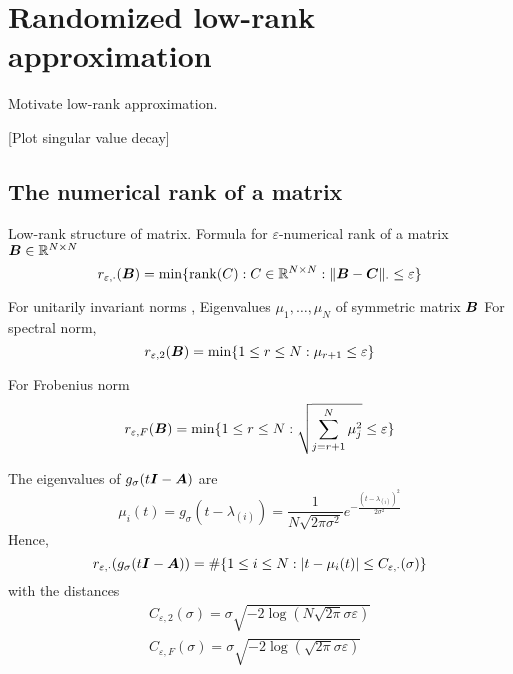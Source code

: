 \chapter{Randomized low-rank approximation}
\label{chp:3-nystrom}

Motivate low-rank approximation.

[Plot singular value decay]


\section{The numerical rank of a matrix}
\label{sec:3-nystrom-numerical-rank}

Low-rank structure of matrix.
Formula for $\varepsilon$-numerical rank \cite[Definition~1.1]{noga2013rank} of a matrix $\boldsymbol{\boldsymbol{B}} \in \mathbb{R}^{N \times N}$
\begin{equation}
    r_{\varepsilon, \cdot}(\boldsymbol{\boldsymbol{B}}) = \min \{\operatorname{rank}(C): C \in \mathbb{R}^{N \times N}: \lVert \boldsymbol{\boldsymbol{B}} - \boldsymbol{C} \rVert _{\cdot} \leq \varepsilon \}
    \label{equ:3-nystrom-SS-def-numerical-low-rank}
\end{equation}

For unitarily invariant norms \cite[Theorem~5]{mirsky1960truncation},
Eigenvalues $\mu_1, \dots, \mu_N$ of symmetric matrix $\boldsymbol{B}$
For spectral norm,
\begin{equation}
    r_{\varepsilon, 2}(\boldsymbol{\boldsymbol{B}}) = \min \{1 \leq r \leq N: \mu_{r+1} \leq \varepsilon \}
    \label{equ:3-nystrom-SS-def-numerical-low-rank-spectral-norm}
\end{equation}

For Frobenius norm
\begin{equation}
    r_{\varepsilon, F}(\boldsymbol{\boldsymbol{B}}) = \min \{1 \leq r \leq N: \sqrt{\sum_{j=r+1}^N \mu_{j}^2} \leq \varepsilon \}
    \label{equ:3-nystrom-SS-def-numerical-low-rank-frobenius-norm}
\end{equation}

The eigenvalues of $g_{\sigma}(t\boldsymbol{I} - \boldsymbol{A})$ are
\begin{equation}
    \mu_i(t) = g_{\sigma}(t - \lambda_{(i)}) = \frac{1}{N \sqrt{2 \pi \sigma^2}} e^{-\frac{(t - \lambda_{(i)})^2}{2 \sigma^2}}
\end{equation}
Hence, 
\begin{equation}
    r_{\varepsilon, \cdot}(g_{\sigma}(t\boldsymbol{I} - \boldsymbol{A})) = \#\{1\leq i\leq N: |t - \mu_i(t)| \leq C_{\varepsilon, \cdot}(\sigma)\}
\end{equation}
with the distances
\begin{align}
    C_{\varepsilon, 2}(\sigma) = \sigma \sqrt{-2 \log(N \sqrt{2 \pi} \sigma \varepsilon)} \\
    C_{\varepsilon, F}(\sigma) = \sigma \sqrt{-2 \log(\sqrt{2 \pi} \sigma \varepsilon)}
\end{align}

